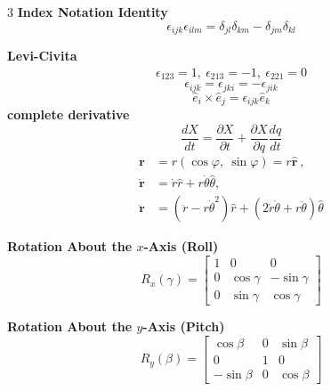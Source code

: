 \documentclass[1pt]{article}
\begin{document}
\begin{multicols}{3}
\textbf{Index Notation Identity}
\begin{equation*}
    \epsilon_{ijk} \epsilon_{ilm} = \delta_{jl} \delta_{km} - \delta_{jm} \delta_{kl}
\end{equation*}

\textbf{Levi-Civita}
\begin{align*}
    \epsilon_{123}=1,\ \epsilon_{213}=-1
    ,\ \epsilon_{221}=0
\end{align*}
\begin{equation*}
    \epsilon_{ijk}= \epsilon_{jki} = -\epsilon_{jik}
\end{equation*}
\begin{equation*}
    \hat{e}_i \times \hat{e}_j=\epsilon_{i j k} \hat{e}_k
\end{equation*}
\textbf{complete derivative}
\begin{equation*}
    \frac{d X}{d t}=\frac{\partial X}{\partial t}+\frac{\partial X}{\partial q} \frac{d q}{d t} 
\end{equation*}
\begin{align*}
        \mathbf{r}  & = r(\cos\varphi,\ \sin\varphi) = r \hat{\mathbf{r}}\ , \\[1ex]
   \dot{\mathbf{r}} &= \dot{r}\hat{r}+r\dot{\theta}\hat{\theta} ,\\[1ex]
  \ddot{\mathbf{r}} &=(\ddot{r}-r\dot{\theta}^2)\hat{r}+(2\dot{r}\dot{\theta}+r\ddot{\theta})\hat{\theta}
\end{align*}

\textbf{Rotation About the $x$-Axis (Roll)}
\begin{equation*}
R_x(\gamma) =
\begin{bmatrix}
1 & 0 & 0 \\
0 & \cos\gamma & -\sin\gamma \\
0 & \sin\gamma & \cos\gamma
\end{bmatrix}
\end{equation*}

\textbf{Rotation About the $y$-Axis (Pitch)}
\begin{equation*}
R_y(\beta) =
\begin{bmatrix}
\cos\beta & 0 & \sin\beta \\
0 & 1 & 0 \\
-\sin\beta & 0 & \cos\beta
\end{bmatrix}
\end{equation*}


\end{multicols}
\end{document}
